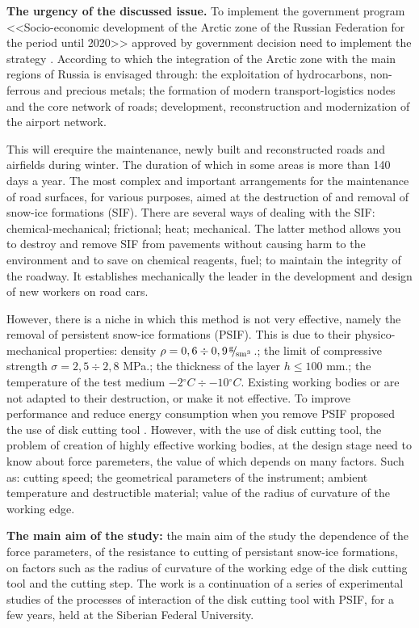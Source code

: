 \textbf{The urgency of the discussed issue.} To implement the government program <<Socio-economic development of the Arctic zone of the Russian Federation for the period until 2020>> approved by government decision \cite{PostRF} need to implement the strategy \cite{Strategi}. According to which the integration of the Arctic zone with the main regions of Russia is envisaged through: the exploitation of hydrocarbons, non-ferrous and precious metals; the formation of modern transport-logistics nodes and the core network of roads; development, reconstruction and modernization of the airport network.

This will erequire the maintenance, newly built and reconstructed roads and airfields during winter. The duration of which in some areas is more than 140 days a year. The most complex and important arrangements for the maintenance of road surfaces, for various purposes, aimed at the destruction of and removal of snow-ice formations (SIF). There are several ways of dealing with the SIF: chemical-mechanical; frictional; heat; mechanical. The latter method allows you to destroy and remove SIF from pavements without causing harm to the environment and to save on chemical reagents, fuel; to maintain the integrity of the roadway. It establishes mechanically the leader in the development and design of new workers on road cars.

However, there is a niche in which this method is not very effective, namely the removal of persistent snow-ice formations (PSIF). This is due to their physico-mechanical properties: density $\rho = 0,6 \div 0,9 \hspace{3pt}\!^{\text{g}}\!\!\hspace{1pt}/ \hspace{2pt}\!\!_{\text{sm}^3}\!\hspace{3pt}$.; the limit of compressive strength $\sigma = 2,5 \div 2,8$ MPa.; the thickness of the layer $h \le 100$ mm.; the temperature of the test medium $-2{}^\circ C\div-10{}^\circ C$. Existing working bodies or are not adapted to their destruction, or make it not effective. To improve performance and reduce energy consumption when you remove PSIF proposed the use of disk cutting tool \cite{GanjaDRI, GanjaPSLO, WorkOrgan}. However, with the use of disk cutting tool, the problem of creation of highly effective working bodies, at the design stage need to know about force paremeters, the value of which depends on many factors. Such as: cutting speed; the geometrical parameters of the instrument; ambient temperature and destructible material; value of the radius of curvature of the working edge. 

\textbf{The main aim of the study:} the main aim of the study the dependence of the force parameters, of the resistance to cutting of persistant snow-ice formations, on factors such as the radius of curvature of the working edge of the disk cutting tool and the cutting step. The work is a continuation of a series of experimental studies of the processes of interaction of the disk cutting tool with PSIF, for a few years, held at the Siberian Federal University.

